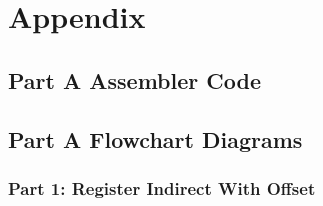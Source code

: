 \documentclass[letterpaper]{article}
\begin{document}
\newpage
\section{Appendix}
  \subsection{Part A Assembler Code}
    
\newpage


  \subsection{Part A Flowchart Diagrams}

  \subsubsection{Part 1: Register Indirect With Offset}
  \vspace{2cm}
  \noindent{}
\newpage
\end{document}
